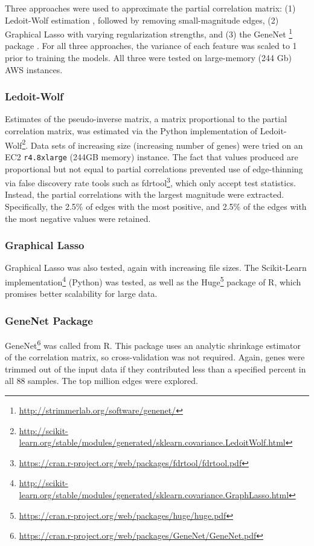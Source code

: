 Three approaches were used to approximate the partial correlation matrix: (1) Ledoit-Wolf estimation \cite{ledoit2003}, followed by removing small-magnitude edges, (2) Graphical Lasso \cite{friedman2008} with varying regularization strengths, and (3) the GeneNet \footnote{\url{http://strimmerlab.org/software/genenet/}} package \cite{schafer2001, schafer2005}.
For all three approaches, the variance of each feature was scaled to 1 prior to training the models.
All three were tested on large-memory (244 Gb) AWS instances.

\subsubsection{Ledoit-Wolf}
Estimates of the pseudo-inverse matrix, a matrix proportional to the partial correlation matrix, was estimated via the Python implementation of Ledoit-Wolf\footnote{\url{http://scikit-learn.org/stable/modules/generated/sklearn.covariance.LedoitWolf.html}}.
Data sets of increasing size (increasing number of genes) were tried on an EC2 \texttt{r4.8xlarge} (244GB memory) instance.
The fact that values produced are proportional but not equal to partial correlations prevented use of edge-thinning via false discovery rate tools such as fdrtool\footnote{\url{https://cran.r-project.org/web/packages/fdrtool/fdrtool.pdf}}, which only accept test statistics.
Instead, the partial correlations with the largest magnitude were extracted.
Specifically, the 2.5\% of edges with the most positive, and 2.5\% of the edges with the most negative values were retained.

\subsubsection{Graphical Lasso}
Graphical Lasso was also tested, again with increasing file sizes.
The Scikit-Learn implementation\footnote{\url{http://scikit-learn.org/stable/modules/generated/sklearn.covariance.GraphLasso.html}} \cite{scikit-learn} (Python) was tested, as well as the Huge\footnote{\url{https://cran.r-project.org/web/packages/huge/huge.pdf}} \cite{zhao2012}  package of R, which promises better scalability for large data.

\subsubsection{GeneNet Package}
GeneNet\footnote{\url{https://cran.r-project.org/web/packages/GeneNet/GeneNet.pdf}} was called from R.
This package uses an analytic shrinkage estimator of the correlation matrix, so cross-validation was not required.
Again, genes were trimmed out of the input data if they contributed less than a specified percent in all 88 samples.
The top million edges were explored.

